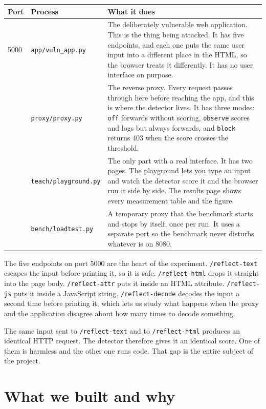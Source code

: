 \documentclass[11pt,a4paper]{article}
\newcommand{\tc}[1]{\texttt{\small #1}}
\begin{document}
\begin{center}
\begin{tabular}{@{}l l p{8.4cm}@{}}
\toprule
\textbf{Port} & \textbf{Process} & \textbf{What it does} \\
\midrule
5000 & \tc{app/vuln\_app.py} &
The deliberately vulnerable web application. This is the thing being attacked. It has five
endpoints, and each one puts the same user input into a different place in the HTML, so the
browser treats it differently. It has no user interface on purpose. \\
\addlinespace
8080 & \tc{proxy/proxy.py} &
The reverse proxy. Every request passes through here before reaching the app, and this is
where the detector lives. It has three modes: \tc{off} forwards without scoring,
\tc{observe} scores and logs but always forwards, and \tc{block} returns 403 when the score
crosses the threshold. \\
\addlinespace
5001 & \tc{teach/playground.py} &
The only part with a real interface. It has two pages. The playground lets you type an
input and watch the detector score it and the browser run it side by side. The results page
shows every measurement table and the figure. \\
\addlinespace
8090 & \tc{bench/loadtest.py} &
A temporary proxy that the benchmark starts and stops by itself, once per run. It uses a
separate port so the benchmark never disturbs whatever is on 8080. \\
\bottomrule
\end{tabular}
\end{center}

The five endpoints on port 5000 are the heart of the experiment. \tc{/reflect-text} escapes
the input before printing it, so it is safe. \tc{/reflect-html} drops it straight into the
page body. \tc{/reflect-attr} puts it inside an HTML attribute. \tc{/reflect-js} puts it
inside a JavaScript string. \tc{/reflect-decode} decodes the input a second time before
printing it, which lets us study what happens when the proxy and the application disagree
about how many times to decode something.

The same input sent to \tc{/reflect-text} and to \tc{/reflect-html} produces an identical
HTTP request. The detector therefore gives it an identical score. One of them is harmless
and the other one runs code. That gap is the entire subject of the project.

\section{What we built and why}
\end{document}
